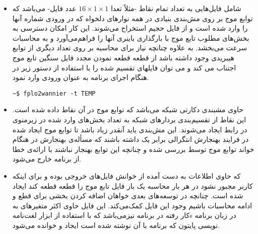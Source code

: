 \begin{itemize}
 \item{}
 شامل فایل‌هایی به تعداد تمام نقاط  -مثلاً تعدا $16\times1\times1$ عدد فایل- می‌باشد که توابع موج بر روی مش‌بندی بنیادی در همه نوارهای دلخواه که در 
ورودی شماره آنها را وارد شده است و از فایل حجیم   استخراج می‌شوند. این کار 
امکان دسترسی به بخش‌های مطلوب تابع موج با بارگذاری باینری آنها را فراهم‌می‌آورد و به محاسبات سرعت می‌بخشد. به علاوه چنانچه نیاز برای محاسبه بر 
روی تعداد دیگری از توابع هیبریدی وجود داشته باشد از قطعه قطعه نمودن مجدد فایل سنگین تابع موج اجتناب می کند و می توان فایلهای تقسیم شده را با استفاده از دستور 
زیر در هنگام اجرای برنامه به عنوان ورودی وارد نمود.
\begin{latin}
\begin{lstlisting}[style=Mybash]
 ~$ fplo2wannier -t TEMP
\end{lstlisting}
\end{latin}
 \item{}
 حاوی مشبندی دکارتی شبکه می‌باشد که توابع موج در آن نقاط داده شده است. این نقاط از تقسیم‌بندی بردارهای شبکه به تعداد بخش‌های وارد شده در زیرمنوی  در 
رابط  ایجاد ‌می‌شوند. این مش‌بندی باید آنقدر زیاد باشد تا توابع موج ایجاد شده در فرایند بهنجارش انتگرالی برابر یک داشته باشند که مسأله‌ی بهنجارش در 
هنگام خواند توابع موج توسط  بررسی شده و چنانچه این توابع بهنجار نباشند با ارائه‌ی خطا از برنامه خارج می‌شود.
 \item{}
که حاوی اطلاعات به دست آمده از خوانش فایل‌های خروجی  بوده و برای اینکه کاربر مجبور نشود در هر بار محاسبه یک بار فایل تابع موج را قطعه قطعه کند ایجاد 
شده است. چنانچه در توسعه‌های بعدی خواهان اضافه کردن بخشی برای قطع و ادامه محاسبات باشیم وجود این فایل کمک‌می‌کند. این فایل حاوی اکثر متغیر‌های به کار رفته در 
برنامه نیز‌می‌باشد که با استفاده از ابزار \glspl{لغت‌نامه} در زبان برنامه نویسی پایتون که برنامه  با آن نوشته شده است ایجاد و خوانده ‌می‌شود.
\end{itemize}